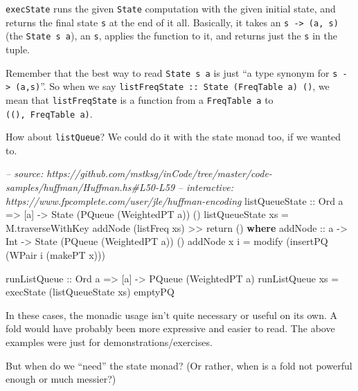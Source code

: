 \documentclass[]{article}
\newenvironment{Shaded}{}{}
\newcommand{\KeywordTok}[1]{\textcolor[rgb]{0.00,0.44,0.13}{\textbf{#1}}}
\newcommand{\DataTypeTok}[1]{\textcolor[rgb]{0.56,0.13,0.00}{#1}}
\newcommand{\CommentTok}[1]{\textcolor[rgb]{0.38,0.63,0.69}{\textit{#1}}}
\newcommand{\OtherTok}[1]{\textcolor[rgb]{0.00,0.44,0.13}{#1}}
\newcommand{\FunctionTok}[1]{\textcolor[rgb]{0.02,0.16,0.49}{#1}}
\newcommand{\NormalTok}[1]{#1}
\begin{document}
\texttt{execState} runs the given \texttt{State} computation with the given
initial state, and returns the final state \texttt{s} at the end of it all.
Basically, it takes an \texttt{s\ -\textgreater{}\ (a,\ s)} (the
\texttt{State\ s\ a}), an \texttt{s}, applies the function to it, and returns
just the \texttt{s} in the tuple.

Remember that the best way to read \texttt{State\ s\ a} is just ``a type synonym
for \texttt{s\ -\textgreater{}\ (a,s)}''. So when we say
\texttt{listFreqState\ ::\ State\ (FreqTable\ a)\ ()}, we mean that
\texttt{listFreqState} is a function from a \texttt{FreqTable\ a} to
\texttt{((),\ FreqTable\ a)}.

How about \texttt{listQueue}? We could do it with the state monad too, if we
wanted to.

\begin{Shaded}
\begin{Highlighting}[]
\CommentTok{-- source: https://github.com/mstksg/inCode/tree/master/code-samples/huffman/Huffman.hs#L50-L59}
\CommentTok{-- interactive: https://www.fpcomplete.com/user/jle/huffman-encoding}
\OtherTok{listQueueState ::} \DataTypeTok{Ord}\NormalTok{ a }\OtherTok{=>}\NormalTok{ [a] }\OtherTok{->} \DataTypeTok{State}\NormalTok{ (}\DataTypeTok{PQueue}\NormalTok{ (}\DataTypeTok{WeightedPT}\NormalTok{ a)) ()}
\NormalTok{listQueueState xs }\FunctionTok{=}\NormalTok{ M.traverseWithKey addNode (listFreq xs) }\FunctionTok{>>}\NormalTok{ return ()}
  \KeywordTok{where}
\OtherTok{    addNode ::}\NormalTok{ a }\OtherTok{->} \DataTypeTok{Int} \OtherTok{->} \DataTypeTok{State}\NormalTok{ (}\DataTypeTok{PQueue}\NormalTok{ (}\DataTypeTok{WeightedPT}\NormalTok{ a)) ()}
\NormalTok{    addNode x i }\FunctionTok{=}\NormalTok{ modify (insertPQ (}\DataTypeTok{WPair}\NormalTok{ i (makePT x)))}

\OtherTok{runListQueue ::} \DataTypeTok{Ord}\NormalTok{ a }\OtherTok{=>}\NormalTok{ [a] }\OtherTok{->} \DataTypeTok{PQueue}\NormalTok{ (}\DataTypeTok{WeightedPT}\NormalTok{ a)}
\NormalTok{runListQueue xs }\FunctionTok{=}\NormalTok{ execState (listQueueState xs) emptyPQ}
\end{Highlighting}
\end{Shaded}

In these cases, the monadic usage isn't quite necessary or useful on its own. A
fold would have probably been more expressive and easier to read. The above
examples were just for demonstrations/exercises.

But when do we ``need'' the state monad? (Or rather, when is a fold not powerful
enough or much messier?)
\end{document}
